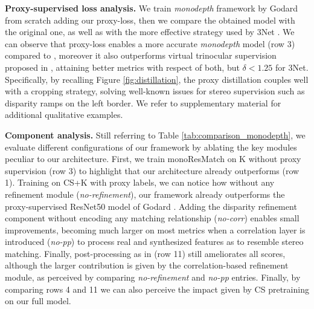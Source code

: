 \documentclass[10pt,twocolumn,letterpaper]{article}
\begin{document}
\textbf{Proxy-supervised loss analysis.} We train \emph{monodepth} framework by Godard \etal \cite{monodepth17} from scratch adding our proxy-loss, then we compare the obtained model with the original one, as well as with the more effective strategy used by 3Net \cite{3net18}. We can observe that proxy-loss enables a more accurate \emph{monodepth} model (row 3) compared to \cite{monodepth17}, moreover it also outperforms virtual trinocular supervision proposed in \cite{3net18}, attaining better metrics with respect of both, but $\delta<1.25$ for 3Net. 
Specifically, by recalling Figure \ref{fig:distillation}, the proxy distillation couples well with a cropping strategy, solving well-known issues for stereo supervision such as disparity ramps on the left border. 
We refer to supplementary material for additional qualitative examples.




\textbf{Component analysis.} Still referring to Table \ref{tab:comparison_monodepth}, we evaluate different configurations of our framework by ablating the key modules peculiar to our architecture. 
First, we train monoResMatch on K without proxy supervision (row 3) to highlight that our architecture already outperforms \cite{monodepth17} (row 1). 
Training on CS+K with proxy labels, we can notice how without any refinement module (\textit{no-refinement}), our framework already outperforms the proxy-supervised ResNet50 model of Godard \etal \cite{monodepth17}. Adding the disparity refinement component without encoding any matching relationship (\textit{no-corr}) enables small improvements, becoming much larger on most metrics when a correlation layer is introduced (\textit{no-pp}) to process real and synthesized features as to resemble stereo matching. Finally, post-processing as in \cite{monodepth17} (row 11) still ameliorates all scores, although the larger contribution is given by the correlation-based refinement module, as perceived by comparing \textit{no-refinement} and \textit{no-pp} entries. Finally, by comparing rows 4 and 11 we can also perceive the impact given by CS pretraining on our full model.
\end{document}
